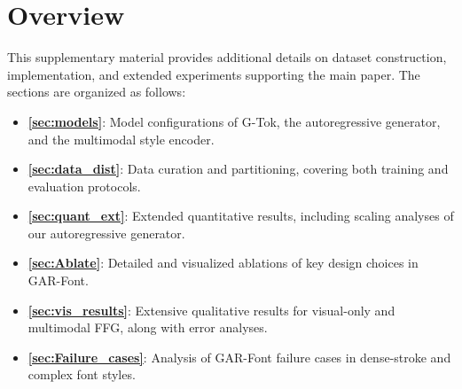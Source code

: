 \clearpage
\setcounter{page}{1}
\setcounter{section}{0}
\setcounter{figure}{0}
\setcounter{table}{0}
\maketitlesupplementary
\renewcommand\thesection{\Alph{section}}
\renewcommand{\thetable}{S\arabic{table}}    %
\renewcommand{\thefigure}{S\arabic{figure}}  %

\section{Overview}
\vspace{-1mm}
This supplementary material provides additional details on dataset construction, implementation, and extended experiments supporting the main paper. The sections are organized as follows:
\begin{itemize}
    \item \textbf{\cref{sec:models}}: Model configurations of G-Tok, the autoregressive generator, and the multimodal style encoder.
    \item \textbf{\cref{sec:data_dist}}: Data curation and partitioning, covering both training and evaluation protocols.
    \item \textbf{\cref{sec:quant_ext}}: Extended quantitative results, including scaling analyses of our autoregressive generator.
    \item \textbf{\cref{sec:Ablate}}: Detailed and visualized ablations of key design choices in GAR-Font.
    \item \textbf{\cref{sec:vis_results}}: Extensive qualitative results for visual-only and multimodal FFG, along with error analyses.
    \item \textbf{\cref{sec:Failure_cases}}: Analysis of GAR-Font failure cases in dense-stroke and complex font styles.

    
\end{itemize}

